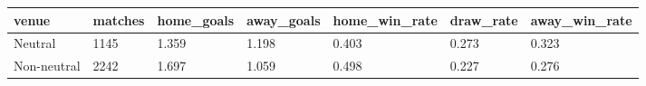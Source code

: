 \begin{tabular}{lllllll}
\toprule
venue & matches & home\_goals & away\_goals & home\_win\_rate & draw\_rate & away\_win\_rate \\
\midrule
Neutral & 1145 & 1.359 & 1.198 & 0.403 & 0.273 & 0.323 \\
Non-neutral & 2242 & 1.697 & 1.059 & 0.498 & 0.227 & 0.276 \\
\bottomrule
\end{tabular}
